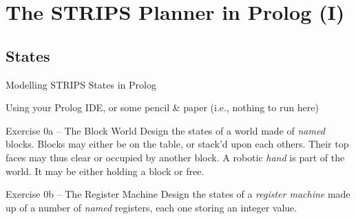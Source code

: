 \documentclass[presentation]{beamer}\mode<presentation>{\usetheme{AMSBolognaFC}}
\begin{document}
\section{The STRIPS Planner in Prolog (I)}

\subsection{States}

\begin{frame}[allowframebreaks]{Modelling STRIPS States in Prolog}

Using your Prolog IDE, or some pencil \& paper (i.e., nothing to run here)

\begin{block}{Exercise 0a -- The Block World}
   	Design the states of a world made of \emph{named} \alert{blocks}.
   	Blocks may either be on the \alert{table}, or stack'd up\alert{on} each others.
   	Their top faces may thus \alert{clear} or occupied by another block.
   	A robotic \emph{hand} is part of the world.
   	It may be either \alert{holding} a block or \alert{free}.
\end{block}

\begin{block}{Exercise 0b -- The Register Machine}
	Design the states of a \emph{register machine} made up of a number of \emph{named} \alert{registers}, each one storing an integer value.
\end{block}

\framebreak


\end{frame}
\end{document}
